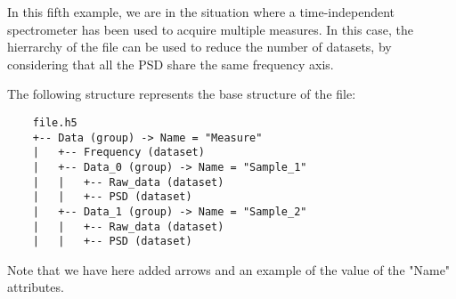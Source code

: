 In this fifth example, we are in the situation where a time-independent spectrometer has been used to acquire multiple measures. In this case, the hierrarchy of the file can be used to reduce the number of datasets, by considering that all the PSD share the same frequency axis.

The following structure represents the base structure of the file:
\begin{verbatim}
    file.h5
    +-- Data (group) -> Name = "Measure"
    |   +-- Frequency (dataset)
    |   +-- Data_0 (group) -> Name = "Sample_1"
    |   |   +-- Raw_data (dataset)
    |   |   +-- PSD (dataset)
    |   +-- Data_1 (group) -> Name = "Sample_2"
    |   |   +-- Raw_data (dataset)
    |   |   +-- PSD (dataset)
\end{verbatim}
Note that we have here added arrows and an example of the value of the "Name" attributes.